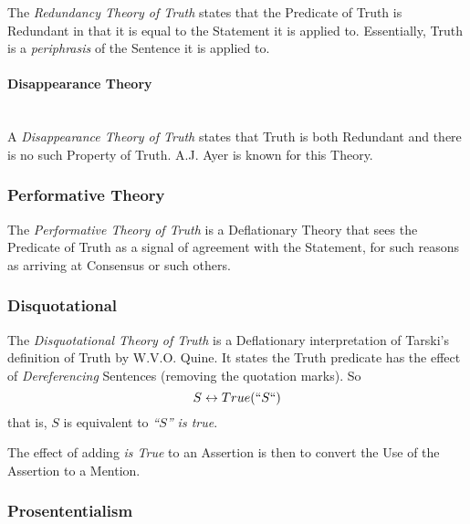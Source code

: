 The \emph{Redundancy Theory of Truth} states that the Predicate of
Truth is Redundant in that it is equal to the Statement it is applied
to.\cite{ramsey27} Essentially, Truth is a \emph{periphrasis} of the
Sentence it is applied to.

\paragraph{Disappearance Theory}
\hfill \\ A \emph{Disappearance Theory of Truth} states that Truth is
both Redundant and there is no such Property of Truth. A.J. Ayer is
known for this Theory.

\subsubsection{Performative Theory}

The \emph{Performative Theory of Truth} is a Deflationary Theory that
sees the Predicate of Truth as a signal of agreement with the
Statement, for such reasons as arriving at Consensus or such others.

\subsubsection{Disquotational}

The \emph{Disquotational Theory of Truth} is a Deflationary
interpretation of Tarski's definition of Truth by W.V.O. Quine. It
states the Truth predicate has the effect of \emph{Dereferencing}
Sentences (removing the quotation marks). So
\[
    S \leftrightarrow True(``S``)
\]
that is, $S$ is equivalent to \emph{``$S$'' is true}.

The effect of adding \emph{is True} to an Assertion is then to convert
the Use of the Assertion to a Mention.

\subsubsection{Prosententialism}

